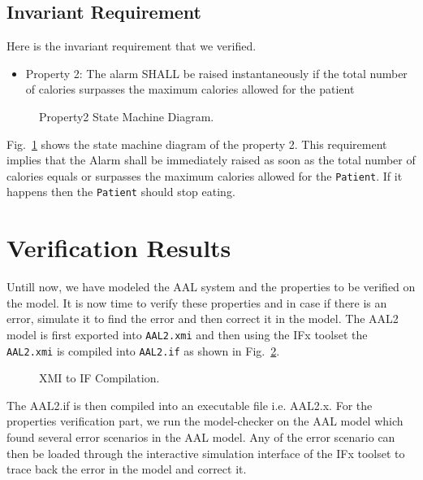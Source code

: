 \documentclass[a4paper,twoside]{article}
\begin{document}
\subsection{Invariant Requirement}
Here is the invariant requirement that we verified.

\begin{itemize}
\item Property 2: The alarm SHALL be raised instantaneously if the total number of calories surpasses the maximum calories allowed for the patient 
\end{itemize}

\begin{figure}[!h]
  \centering
  {}
  \caption{Property2 State Machine Diagram.}
  \label{fig:property3stm}
 \end{figure}
 
  
Fig.~\ref{fig:property3stm} shows the state machine diagram of the property 2. This requirement implies that the Alarm shall be immediately raised as soon as the total number of calories equals or surpasses the maximum calories allowed for the \texttt{Patient}. If it happens then the \texttt{Patient} should stop eating.  

\section{Verification Results}
\label{sec:results}
\noindent Untill now, we have modeled the AAL system and the properties to be verified on the model. It is now time to verify these properties and in case if there is an error, simulate it to find the error and then correct it in the model. The AAL2 model is first exported into \texttt{AAL2.xmi} and then using the IFx toolset the \texttt{AAL2.xmi} is compiled into \texttt{AAL2.if} as shown in Fig.~\ref{fig:xmi2if}.

\begin{figure}[!h]
  \centering
  {}
  \caption{XMI to IF Compilation.}
  \label{fig:xmi2if}
 \end{figure}
  
 
The AAL2.if is then compiled into an executable file i.e. AAL2.x. For the properties verification part, we run the model-checker on the AAL model which found several error scenarios in the AAL model. Any of the error scenario can then be loaded through the interactive simulation interface of the IFx toolset to trace back the error in the model and correct it. 
\end{document}
